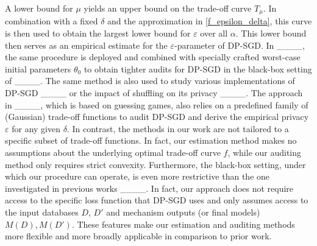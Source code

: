 A lower bound for $\mu$ yields an upper bound on the trade-off curve $T_{\mu}$. In combination with a fixed $\delta$ and the approximation in \eqref{f_epsilon_delta}, this curve is then used to obtain the largest lower bound for $\varepsilon$ over all $\alpha$. This lower bound then serves as an empirical estimate for the $\varepsilon$-parameter of DP-SGD. In ____, the same procedure is deployed and combined with specially crafted worst-case initial parameters $\theta_0$ to obtain tighter audits for DP-SGD in the black-box setting of ____. The same method is also used to study various implementations of DP-SGD ____ or the impact of shuffling on its privacy ____. The approach in ____, which is based on guessing games, also relies on a predefined family of (Gaussian) trade-off functions to audit DP-SGD and derive the empirical privacy $\varepsilon$ for any given $\delta$. In contrast, the methods in our work are not tailored to a specific subset of trade-off functions. In fact, our estimation method makes no assumptions about the underlying optimal trade-off curve $f$, while our auditing method only requires strict convexity. Furthermore, the black-box setting, under which our procedure can operate, is even more restrictive than the one investigated in previous works ____. In fact, our approach does not require access to the specific loss function that DP-SGD uses and only assumes access to the input databases $D$, $D'$ and mechanism outputs (or final models) $M(D), M(D')$. These features make our estimation and auditing methods more flexible and more broadly applicable in comparison to prior work.



